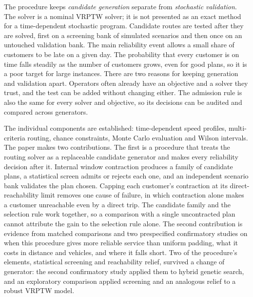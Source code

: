 \documentclass[11pt,a4paper]{article}
\begin{document}
The procedure keeps \emph{candidate generation} separate from \emph{stochastic
validation}. The solver is a nominal VRPTW solver; it is not presented as an
exact method for a time-dependent stochastic program. Candidate routes are tested
after they are solved, first on a screening bank of simulated scenarios and then
once on an untouched validation bank. The main reliability event allows a small
share of customers to be late on a given day. The probability that every customer
is on time falls steadily as the number of customers grows, even for good plans,
so it is a poor target for large instances. There are two reasons for keeping
generation and validation apart. Operators often already have an objective and a
solver they trust, and the test can be added without changing either. The
admission rule is also the same for every solver and objective, so its decisions
can be audited and compared across generators.

The individual components are established: time-dependent speed profiles,
multi-criteria routing, chance constraints, Monte Carlo evaluation and Wilson
intervals. The paper makes two contributions. The first is a procedure that
treats the routing solver as a replaceable candidate generator and makes every
reliability decision after it. Internal window contraction produces a family of
candidate plans, a statistical screen admits or rejects each one, and an
independent scenario bank validates the plan chosen. Capping each customer's
contraction at its direct-reachability limit removes one cause of failure, in
which contraction alone makes a customer unreachable even by a direct trip. The
candidate family and the selection rule work together, so a comparison with a
single uncontracted plan cannot attribute the gain to the selection rule alone.
The second contribution is evidence from matched comparisons and two
prespecified confirmatory studies on when this procedure gives more reliable
service than uniform padding, what it costs in distance and vehicles, and where
it falls short. Two of the procedure's elements, statistical screening and
reachability relief, survived a change of generator: the second confirmatory
study applied them to hybrid genetic search, and an exploratory comparison
applied screening and an analogous relief to a robust VRPTW model.
\end{document}
